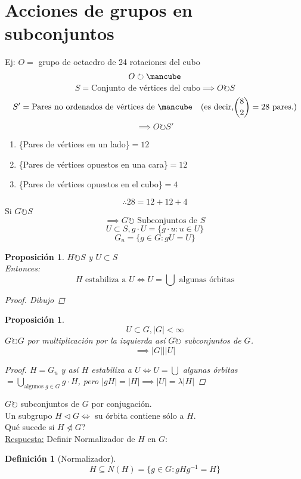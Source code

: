 \documentclass[11pt]{book}
\newcommand*\cube{\mbox{\mancube}}
\newtheorem{prop}[thm]{Proposición}
\theoremstyle{definition}
\newtheorem{defn}{Definición}[section]
\begin{document}
\section{Acciones de grupos en subconjuntos}
Ej: $O=$ grupo de octaedro de 24 rotaciones del cubo
\[O\circlearrowright\cube\]
\[S=\textrm{Conjunto de vértices del cubo}\implies O\circlearrowright S\]
\[S'=\textrm{Pares no ordenados de vértices de }\cube\quad(\textrm{es decir,}\binom{8}{2}=28\textrm{ pares.})\]
\[\implies O\circlearrowright S'\]
\begin{enumerate}[label=(\roman*)]
	\item \{Pares de vértices en un lado\}$=12$

	\item \{Pares de vértices opuestos en una cara\}$=12$

	\item \{Pares de vértices opuestos en el cubo\}$=4$
\end{enumerate}
\[\therefore 28=12+12+4\]
Si $G\circlearrowright S$
\[\implies G\circlearrowright\textrm{ Subconjuntos de }S\]
\[U\subset S, g\cdot U=\{g\cdot u:u\in U\}\]
\[G_u=\{g\in G:gU=U\}\]
\begin{prop}
	$H\circlearrowright S$ y $U\subset S$\\
	Entonces:
	\[H\textrm{ estabiliza a }U\iff U=\bigcup\textrm{ algunas órbitas}\]
	\begin{proof}
		Dibujo
	\end{proof}
\end{prop}
\begin{prop}
	\[U\subset G, |G|<\infty\]
	$G\circlearrowright G$ por multiplicación por la izquierda así $G\circlearrowright$ subconjuntos de $G$.
	\[\implies |G| | |U|\]
	\begin{proof}
		$H=G_u$ y así $H$ estabiliza a $U\iff U=\bigcup$ algunas órbitas $=\bigcup_{\textrm{algunos }g\in G}g\cdot H$, pero $|gH|=|H|\implies |U|=\lambda |H|$
	\end{proof}
\end{prop}
$G\circlearrowright$ subconjuntos de $G$ por conjugación.\\
Un subgrupo $H\triangleleft G\iff$ su órbita contiene sólo a $H$.\\
Qué sucede si $H\ntriangleleft G$?\\
\underline{Respuesta:} Definir Normalizador de $H$ en $G$:
\begin{defn}[Normalizador]
	\[H\subseteq N(H)=\{g\in G:gHg^{-1}=H\}\]
\end{defn}
\end{document}
